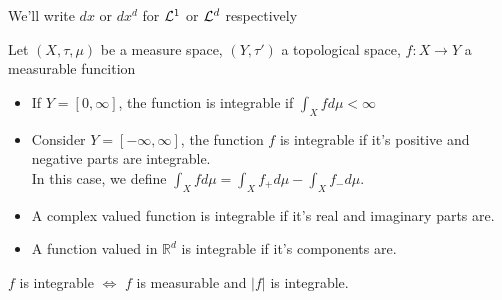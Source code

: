 \documentclass[../main.tex]{subfiles}
\begin{document}
\begin{rmq}
We'll write $dx$ or $dx^{d}$ for $\mathcal{L}^{1}$ or $\mathcal{L}^{d}$ respectively
\end{rmq}
\begin{defn}
	Let $( X,\tau,\mu) $ be a measure space, $( Y,\tau') $ a topological space, $f:X\to Y$ a measurable funcition
	\begin{itemize}
	\item If $Y = [ 0, \infty ] $, the function is integrable if $ \int_{ X }^{  } f d\mu< \infty $ 
	\item Consider $Y = [ - \infty , \infty ] $, the function $f$ is integrable if it's positive and negative parts are integrable.\\
In this case, we define $ \int_{ X }^{  }f d\mu = \int_{ X }^{  } f_+ d\mu - \int_{ X }^{  }f_- d\mu$.
\item A complex valued function is integrable if it's real and imaginary parts are.
\item A function valued in $ \mathbb{R}^{d}$ is integrable if it's components are.
	\end{itemize}
\end{defn}
\begin{rmq}
$f$ is integrable $\iff$  $f$ is measurable and $|f|$ is integrable.
\end{rmq}
\end{document}

